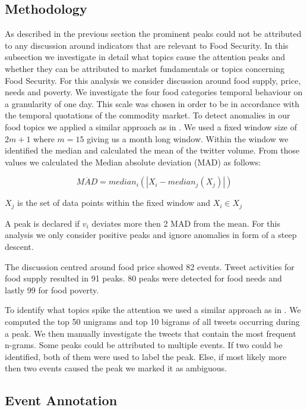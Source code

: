\subsection{Methodology} 

As described in the previous section the prominent peaks could not be attributed to any discussion around indicators that are relevant to Food Security. In this subsection we investigate in detail what topics cause the attention peaks and whether they can be attributed to market fundamentals or topics concerning Food Security. For this analysis we consider discussion around food supply, price, needs and poverty. 
We investigate the four food categories temporal behaviour on a granularity of one day. This scale was chosen in order to be in accordance with the temporal quotations of the commodity market. 
To detect anomalies in our food topics we applied a similar approach as in \cite{olt15} \cite{Lehmann2012}. We used a fixed window size of $2m + 1$  where $m = 15$ giving us a month long window. Within the window we identified the median and calculated the mean of the twitter volume. From those values we calculated the Median absolute deviation (MAD) as follows: 

\begin{equation} \label{eq:solve}
\overline{ MAD } = median_i (|X_i - median_j(X_j)|)\end{equation}


$X_j$ is the set of data points within the fixed window and $X_i \in X_j$

A peak is declared if $v_i$ deviates more then 2 MAD from the mean. For this analysis we only consider positive peaks and ignore anomalies in form of a steep descent. 

The discussion centred around food price showed 82 events. Tweet activities for food supply resulted in 91 peaks. 80 peaks were detected for food needs and lastly 99 for food poverty. 
 

To identify what topics spike the attention we used a similar approach as in \cite{olt15}. We computed the top 50 unigrams and top 10 bigrams of all tweets occurring during a peak. We then manually investigate the tweets that contain the most frequent n-grams. Some peaks could be attributed to multiple events. If two could be identified, both of them were used to label the peak. Else, if most likely more then two events caused the peak we marked it as ambiguous.  

\subsection{Event Annotation}

